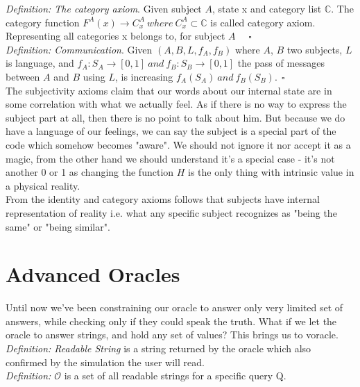 \documentclass{article}
\begin{document}
\textit{Definition: The category axiom}. Given subject $A$, state x and category list $\mathbb{C}$. The category function $F^A(x)\to C_{x}^{A}\ where \ C_{x}^{A} \subset \mathbb{C}$ is called category axiom. Representing all categories x belongs to, for subject $A$ \ \ $\square$\\

\textit{Definition: Communication}. Given $(A, B, L, f_{A}, f_{B})$ where  $A$, $B$ two subjects, $L$ is language, and $f_A:S_A \to [0, 1] \ and\ f_B:S_B \to [0,1]$ the pass of messages between $A$ and $B$ using $L$, is increasing $f_A(S_A)\ and\ f_B(S_B).\ \  \square$\\

The subjectivity axioms claim that our words about our internal state are in some correlation with what we actually feel. As if there is no way to express the subject part at all, then there is no point to talk about him. But because we do have a language of our feelings, we can say the subject is a special part of the code which somehow becomes "aware". We should not ignore it nor accept it as a magic, from the other hand we should understand it's a special case - it's not another 0 or 1 as changing the function $H$ is the only thing with intrinsic value in a physical reality. \\

From the identity and category axioms follows that subjects have internal representation of reality i.e. what any specific subject recognizes as "being the same" or "being similar".\\



\section{Advanced Oracles}

Until now we've been constraining our oracle to answer only very limited set of answers, while checking only if they could speak the truth. What if we let the oracle to answer strings, and hold any set of values? This brings us to voracle. \\ 

\textit{Definition: Readable String} is a string returned by the oracle which also confirmed by the simulation the user will read. \\

\textit{Definition: $\mathcal{O}$} is a set of all readable strings for a specific query Q. \\
\end{document}
